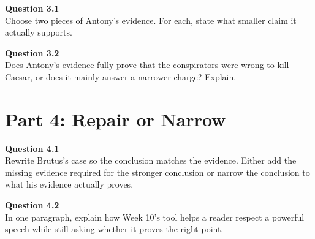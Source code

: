 \documentclass[12pt]{article}
\begin{document}
\textbf{Question 3.1}\\[-0.15em]
Choose two pieces of Antony's evidence. For each, state what smaller claim it actually supports.


\textbf{Question 3.2}\\[-0.15em]
Does Antony's evidence fully prove that the conspirators were wrong to kill Caesar, or does it mainly answer a narrower charge? Explain.


\newpage

\section*{Part 4: Repair or Narrow}

\textbf{Question 4.1}\\[-0.15em]
Rewrite Brutus's case so the conclusion matches the evidence. Either add the missing evidence required for the stronger conclusion or narrow the conclusion to what his evidence actually proves.


\textbf{Question 4.2}\\[-0.15em]
In one paragraph, explain how Week 10's tool helps a reader respect a powerful speech while still asking whether it proves the right point.

\end{document}
